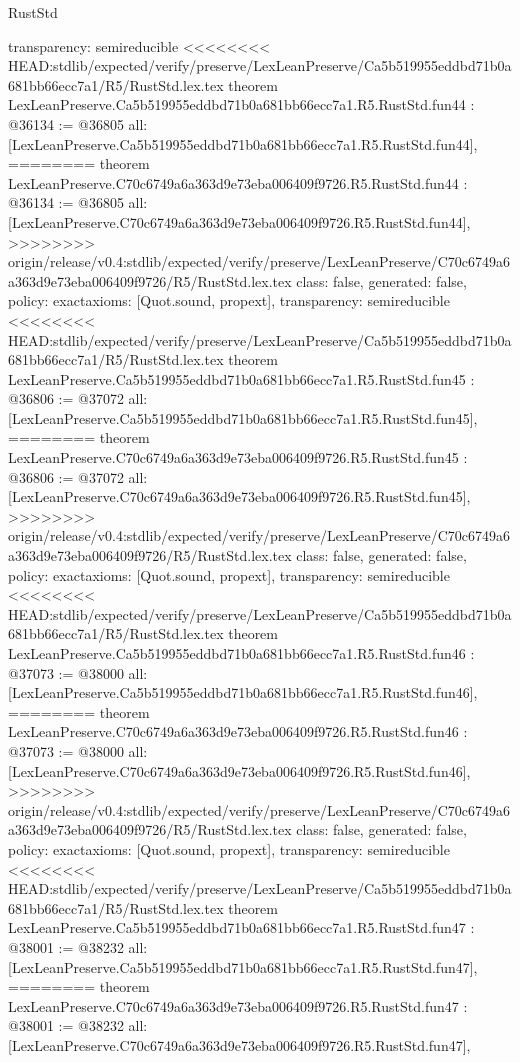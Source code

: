 \begin{lexlean}{RustStd}
\begin{coremodule}
{\begin{coremodule}
{{{{{{{{{{{{{{{{{{{{{{{{{{{{{{{{{{{{{{{{{{{{{{{  transparency: semireducible
}
<<<<<<<< HEAD:stdlib/expected/verify/preserve/LexLeanPreserve/Ca5b519955eddbd71b0a681bb66ecc7a1/R5/RustStd.lex.tex
theorem LexLeanPreserve.Ca5b519955eddbd71b0a681bb66ecc7a1.R5.RustStd.fun44 : @36134 := @36805 {
  all: [LexLeanPreserve.Ca5b519955eddbd71b0a681bb66ecc7a1.R5.RustStd.fun44],
========
theorem LexLeanPreserve.C70c6749a6a363d9e73eba006409f9726.R5.RustStd.fun44 : @36134 := @36805 {
  all: [LexLeanPreserve.C70c6749a6a363d9e73eba006409f9726.R5.RustStd.fun44],
>>>>>>>> origin/release/v0.4:stdlib/expected/verify/preserve/LexLeanPreserve/C70c6749a6a363d9e73eba006409f9726/R5/RustStd.lex.tex
  class: false,
  generated: false,
  policy: exact{axioms: [Quot.sound, propext]},
  transparency: semireducible
}
<<<<<<<< HEAD:stdlib/expected/verify/preserve/LexLeanPreserve/Ca5b519955eddbd71b0a681bb66ecc7a1/R5/RustStd.lex.tex
theorem LexLeanPreserve.Ca5b519955eddbd71b0a681bb66ecc7a1.R5.RustStd.fun45 : @36806 := @37072 {
  all: [LexLeanPreserve.Ca5b519955eddbd71b0a681bb66ecc7a1.R5.RustStd.fun45],
========
theorem LexLeanPreserve.C70c6749a6a363d9e73eba006409f9726.R5.RustStd.fun45 : @36806 := @37072 {
  all: [LexLeanPreserve.C70c6749a6a363d9e73eba006409f9726.R5.RustStd.fun45],
>>>>>>>> origin/release/v0.4:stdlib/expected/verify/preserve/LexLeanPreserve/C70c6749a6a363d9e73eba006409f9726/R5/RustStd.lex.tex
  class: false,
  generated: false,
  policy: exact{axioms: [Quot.sound, propext]},
  transparency: semireducible
}
<<<<<<<< HEAD:stdlib/expected/verify/preserve/LexLeanPreserve/Ca5b519955eddbd71b0a681bb66ecc7a1/R5/RustStd.lex.tex
theorem LexLeanPreserve.Ca5b519955eddbd71b0a681bb66ecc7a1.R5.RustStd.fun46 : @37073 := @38000 {
  all: [LexLeanPreserve.Ca5b519955eddbd71b0a681bb66ecc7a1.R5.RustStd.fun46],
========
theorem LexLeanPreserve.C70c6749a6a363d9e73eba006409f9726.R5.RustStd.fun46 : @37073 := @38000 {
  all: [LexLeanPreserve.C70c6749a6a363d9e73eba006409f9726.R5.RustStd.fun46],
>>>>>>>> origin/release/v0.4:stdlib/expected/verify/preserve/LexLeanPreserve/C70c6749a6a363d9e73eba006409f9726/R5/RustStd.lex.tex
  class: false,
  generated: false,
  policy: exact{axioms: [Quot.sound, propext]},
  transparency: semireducible
}
<<<<<<<< HEAD:stdlib/expected/verify/preserve/LexLeanPreserve/Ca5b519955eddbd71b0a681bb66ecc7a1/R5/RustStd.lex.tex
theorem LexLeanPreserve.Ca5b519955eddbd71b0a681bb66ecc7a1.R5.RustStd.fun47 : @38001 := @38232 {
  all: [LexLeanPreserve.Ca5b519955eddbd71b0a681bb66ecc7a1.R5.RustStd.fun47],
========
theorem LexLeanPreserve.C70c6749a6a363d9e73eba006409f9726.R5.RustStd.fun47 : @38001 := @38232 {
  all: [LexLeanPreserve.C70c6749a6a363d9e73eba006409f9726.R5.RustStd.fun47],
}}}}}}}}}}}}}}}}}}}}}}}}}}}}}}}}}}}}}}}}}}}}}}}}}}}
\end{coremodule}}
\end{coremodule}
\end{lexlean}
